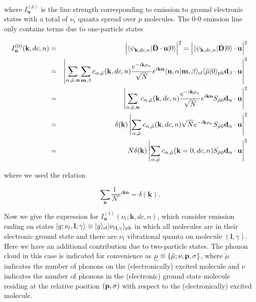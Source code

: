 \documentclass[pt12]{article}
\newcommand{\beq}{\begin{equation}}
\newcommand{\eeq}{\end{equation}}
\newcommand{\bfk}{\mathbf{k}}
\newcommand{\bfn}{\mathbf{n}}
\newcommand{\bfm}{\mathbf{m}}
\newcommand{\bfd}{\mathbf{d}}
\newcommand{\bfu}{\mathbf{u}}
\newcommand{\bfl}{\mathbf{l}}
\newcommand{\tmu}{\tilde{\mu}}
\newcommand{\umu}{\underline{\mu}}
\begin{document}
where $I_\bfu^{(p)}$ is the line strength corresponding to emission to ground electronic states with a total of $\nu_t$ quanta spread over $p$ molecules.
The 0-0 emission line only contains terms due to one-particle states

\begin{eqnarray}
I_\bfu^{(0)}(\bfk,dc,n)&=&\left|\langle\psi_{\bfk,dc,n}|\hat{\mathbf{D}}\cdot
\mathbf{u} |0
\rangle\right|^2=\left|\langle\psi_{\bfk,dc,n}|\hat{\mathbf{D}}
|0\rangle  \cdot
\mathbf{u}\right|^2\\
&=&\left|\sum_{\alpha,\tmu,\bfn}\sum_{\bfm,\beta}
c_{\alpha,\tmu}(\bfk,dc,n) \frac{e^{-i\bfk
\mathbf{\rho}_\alpha}}{\sqrt{N}} e^{i \bfk \bfn} \langle
\bfn,\alpha|\bfm,\beta\rangle_{\rm el} \langle\tmu|0\rangle_{\rm ph} \bfd_\beta\cdot
\mathbf{u}\right|^2\\
&=& \left|\sum_{\alpha,\tmu,\bfn} c_{\alpha,\tmu}(\bfk,dc,n)
\frac{e^{-i\bfk \mathbf{\rho}_\alpha}}{\sqrt{N}} e^{i \bfk \bfn}
S_{\tmu0} \bfd_\alpha\cdot \mathbf{u}\right|^2\\
&=&\delta(\bfk)\left|\sum_{\alpha,\tmu} c_{\alpha,\tmu}(\bfk,dc,n)
\sqrt{N} e^{-i\bfk \mathbf{\rho}_\alpha}
S_{\tmu0} \bfd_\alpha\cdot \mathbf{u}\right|^2\\
&=&N\delta(\bfk)\left|\sum_{\alpha,\tmu} c_{\alpha,\tmu}(\bfk=0,dc,n)
S_{\tmu0} \bfd_\alpha\cdot \mathbf{u}\right|^2\\
\end{eqnarray}

where we used the relation

\beq \sum_\bfn \frac{1}{N} e^{i \bfk \bfn}=\delta (\bfk). \eeq

Now we give the expression for $I_\bfu^{(1)}(\nu_t;\bfk,dc,n)$, which consider emission ending on states $|g;\nu_t,\bfl,\gamma\rangle\equiv |g\rangle_{\rm el}|{\nu_{t }}_{\bfl,\gamma}\rangle_{\rm ph}$ in which all molecules are in their electronic ground state and there are $\nu_t$  vibrational quanta on molecule $(\bfl,\gamma)$. Here we have an additional contribution due to two-particle states. The phonon cloud in this case is indicated for convenience as $\umu\equiv \{ \tmu;\nu,\bf{p},\sigma\}$, where $\tmu$ indicates the number of phonons on the (electronically) excited molecule and $\nu$ indicates the number of phonons in the (electronic) ground state molecule residing at the relative position $(\bf{p},\sigma)$ with respect to the (electronically) excited molecule.
\end{document}

